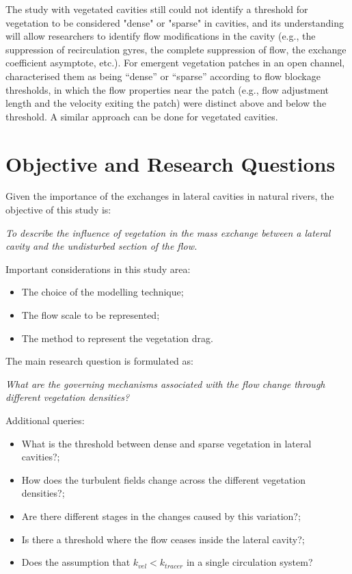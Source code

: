 The study with vegetated cavities still could not identify a threshold for vegetation to be considered "dense" or "sparse" in cavities, and its understanding will allow researchers to identify flow modifications in the cavity (e.g., the suppression of recirculation gyres, the complete suppression of flow, the exchange coefficient asymptote, etc.).  For emergent vegetation patches in an open channel, \textcite{chen2012} characterised them as being “dense” or “sparse” according to flow blockage thresholds, in which the flow properties near the patch (e.g., flow adjustment length and the velocity exiting the patch) were distinct above and below the threshold. A similar approach can be done for vegetated cavities. 
\section{Objective and Research Questions}
Given the importance of the exchanges in lateral cavities in natural rivers, the objective of this study is:

\textit{To describe the influence of vegetation in the mass exchange between a lateral cavity and the undisturbed section of the flow.}

Important considerations in this study area:
\begin{itemize}[noitemsep,topsep=0pt,align=left,itemindent=\parindent]
    \item The choice of the modelling technique;
    \item The flow scale to be represented;
    \item The method to represent the vegetation drag.
\end{itemize}
The main research question is formulated as:

\textit{What are the governing mechanisms associated with the flow change through different vegetation densities?}

Additional queries:
\begin{itemize}[noitemsep,topsep=0pt,align=left,itemindent=\parindent]
	\item What is the threshold between dense and sparse vegetation in lateral cavities?;
    \item How does the turbulent fields change across the different vegetation densities?;
    \item Are there different stages in the changes caused by this variation?;
    \item Is there a threshold where the flow ceases inside the lateral cavity?;
    \item Does the assumption that $k_{vel} < k_{tracer}$ in a single circulation system?
\end{itemize}
